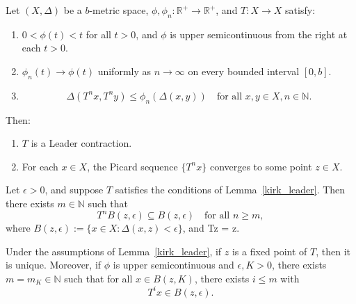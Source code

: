 \documentclass[10pt,a4paper]{amsart}
\begin{document}
\begin{lem}\label{kirk_leader}
Let \((X,\Delta)\) be a \(b\)-metric space, \(\phi, \phi_n : \mathbb{R}^+ \to \mathbb{R}^+\), and \(T: X \to X\) satisfy:
\begin{enumerate}
    \item \(0 < \phi(t) < t\) for all \(t > 0\), and \(\phi\) is upper semicontinuous from the right at each \(t > 0\).
    \item \(\phi_n(t) \to \phi(t)\) uniformly as \(n \to \infty\) on every bounded interval \([0,b]\).
    \item
    \[
    \Delta(T^{n}x, T^{n}y) \leq \phi_n(\Delta(x,y)) \quad \text{for all } x,y \in X, n \in \mathbb{N}.
    \]
\end{enumerate}
Then:
\begin{enumerate}
    \item \(T\) is a Leader contraction.
    \item For each \(x \in X\), the Picard sequence \(\{T^{n} x\}\) converges to some point \(z \in X\).
\end{enumerate}
\end{lem}

\begin{lem}\label{invariant}
Let \(\epsilon > 0\), and suppose \(T\) satisfies the conditions of Lemma~\ref{kirk_leader}. Then there exists \(m \in \mathbb{N}\) such that
\[
T^{n} B(z, \epsilon) \subseteq B(z, \epsilon) \quad \text{for all } n \geq m,
\]
where \(B(z, \epsilon) := \{ x \in X : \Delta(x,z) < \epsilon \}\), and Tz = z.
\end{lem}

\begin{lem}\label{retract}
Under the assumptions of Lemma~\ref{kirk_leader}, if \(z\) is a fixed point of \(T\), then it is unique. Moreover, if \(\phi\) is upper semicontinuous and \(\epsilon, K > 0\), there exists \(m = m_K \in \mathbb{N}\) such that for all \(x \in B(z, K)\), there exists \(i \leq m\) with
\[
T^{i} x \in B(z, \epsilon).
\]
\end{lem}
\end{document}
